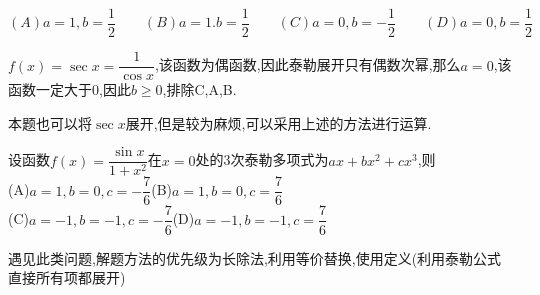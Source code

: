 \documentclass[12pt, a4paper, oneside, UTF8]{ctexbook}
\begin{document}
\begin{sloppypar}
\begin{problem}
        $(A)a=1,b=\dfrac{1}{2}  \qquad (B)a=1.b=\dfrac{1}{2}  \qquad (C)a=0,b=-\dfrac{1}{2} \qquad  (D)a=0,b=\dfrac{1}{2}$
    \end{problem}
    \begin{solution}
        $f(x)=\sec x=\dfrac{1}{\cos x}$,该函数为偶函数,因此泰勒展开只有偶数次幂,那么$a=0$,该函数一定大于0,因此$b \geq 0$,排除C,A,B.
    \end{solution}
    \begin{note}
        本题也可以将$\sec x$展开,但是较为麻烦,可以采用上述的方法进行运算.
    \end{note}
    \begin{problem}
        设函数$f(x)=\dfrac{\sin x}{1+x^2}$在$x=0$处的3次泰勒多项式为$ax + b x ^ 2 + c x ^ 3 $,则
        \\(A)$a=1,b=0,c=-\dfrac{7}{6}$\quad (B)$a=1,b=0,c=\dfrac{7}{6}$\\ (C)$a=-1,b=-1,c=-\dfrac{7}{6}$\quad (D)$a=-1,b=-1,c=\dfrac{7}{6}$
    \end{problem}
    \begin{note}
        遇见此类问题,解题方法的优先级为长除法,利用等价替换,使用定义(利用泰勒公式直接所有项都展开)
    \end{note}

\end{sloppypar}
\end{document}
